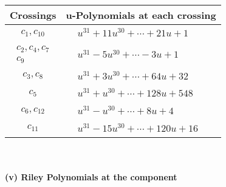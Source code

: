 \documentclass[1p]{elsarticle_modified}
\theoremstyle{definition}
\begin{document}
\begin{tabular}{m{50pt}|m{274pt}}
Crossings & \hspace{64pt}u-Polynomials at each crossing \\
\hline $$\begin{aligned}c_{1},c_{10}\end{aligned}$$&$\begin{aligned}
&u^{31}+11 u^{30}+\cdots+21 u+1
\end{aligned}$\\
\hline $$\begin{aligned}c_{2},c_{4},c_{7}\\c_{9}\end{aligned}$$&$\begin{aligned}
&u^{31}-5 u^{30}+\cdots-3 u+1
\end{aligned}$\\
\hline $$\begin{aligned}c_{3},c_{8}\end{aligned}$$&$\begin{aligned}
&u^{31}+3 u^{30}+\cdots+64 u+32
\end{aligned}$\\
\hline $$\begin{aligned}c_{5}\end{aligned}$$&$\begin{aligned}
&u^{31}+u^{30}+\cdots+128 u+548
\end{aligned}$\\
\hline $$\begin{aligned}c_{6},c_{12}\end{aligned}$$&$\begin{aligned}
&u^{31}- u^{30}+\cdots+8 u+4
\end{aligned}$\\
\hline $$\begin{aligned}c_{11}\end{aligned}$$&$\begin{aligned}
&u^{31}-15 u^{30}+\cdots+120 u+16
\end{aligned}$\\
\hline
\end{tabular}\\~\\
\newpage\renewcommand{\arraystretch}{1}
\flushleft \textbf{(v) Riley Polynomials at the component}\newline \\
\end{document}
